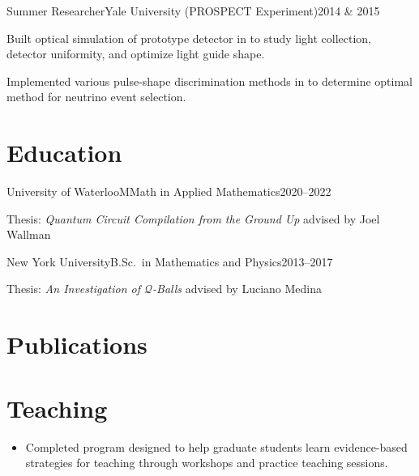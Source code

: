 \documentclass{cultvoucher}
\begin{document}
\begin{entry}{Summer Researcher}{Yale University (\textsc{PROSPECT} Experiment)}{2014 \& 2015}
	\item Built optical simulation of prototype detector in  to study light collection, detector uniformity, and optimize light guide shape.
	\item Implemented various pulse-shape discrimination methods in  to determine optimal method for neutrino event selection.
\end{entry}

\section{Education}

\begin{entry}{University of Waterloo}{MMath in Applied Mathematics}{2020--2022}
	\item Thesis: \textit{Quantum Circuit Compilation from the Ground Up} advised by Joel Wallman
\end{entry}

\begin{entry}{New York University}{B.Sc.\ in Mathematics and Physics}{2013--2017}
	\item Thesis: \textit{An Investigation of $\mathcal{Q}$-Balls} advised by Luciano Medina
\end{entry}

\section{Publications} %


\section{Teaching}

\begin{itemize}
	\item Completed program designed to help graduate students learn evidence-based strategies for teaching through workshops and practice teaching sessions.
\end{itemize}
\end{document}
